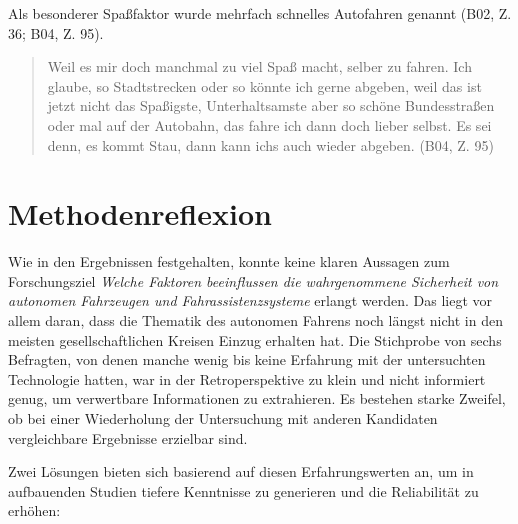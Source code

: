 \documentclass[12pt]{article}
\begin{document}
Als besonderer Spaßfaktor wurde mehrfach schnelles Autofahren genannt (B02, Z. 36; B04, Z. 95).

\begin{quote}
  Weil es mir doch manchmal zu viel Spaß macht, selber zu fahren. Ich glaube, so Stadtstrecken oder so könnte ich gerne abgeben, weil das ist jetzt nicht das Spaßigste, Unterhaltsamste aber so schöne Bundesstraßen oder mal auf der Autobahn, das fahre ich dann doch lieber selbst. Es sei denn, es kommt Stau, dann kann ichs auch wieder abgeben. (B04, Z. 95)
\end{quote}


\clearpage


\clearpage
\section{Methodenreflexion}

Wie in den Ergebnissen festgehalten, konnte keine klaren Aussagen zum Forschungsziel \emph{Welche Faktoren beeinflussen die wahrgenommene Sicherheit von autonomen Fahrzeugen und Fahrassistenzsysteme} erlangt werden.  Das liegt vor allem daran, dass die Thematik des autonomen Fahrens noch längst nicht in den meisten gesellschaftlichen Kreisen Einzug erhalten hat. Die Stichprobe von sechs Befragten, von denen manche wenig bis keine Erfahrung mit der untersuchten Technologie hatten, war in der Retroperspektive zu klein und nicht informiert genug, um verwertbare Informationen zu extrahieren. Es bestehen starke Zweifel, ob bei einer Wiederholung der Untersuchung mit anderen Kandidaten vergleichbare Ergebnisse erzielbar sind.

Zwei Lösungen bieten sich basierend auf diesen Erfahrungswerten an, um in aufbauenden Studien tiefere Kenntnisse zu generieren und die Reliabilität zu erhöhen:
\end{document}
